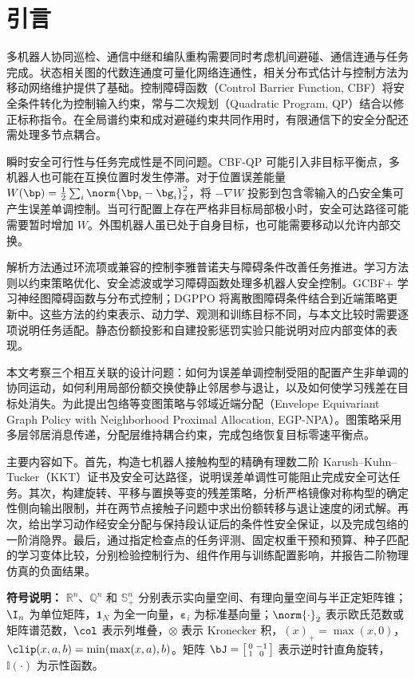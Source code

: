 \section{引言}\label{sec:intro}
多机器人协同巡检、通信中继和编队重构需要同时考虑机间避碰、通信连通与任务完成。状态相关图的代数连通度可量化网络连通性，相关分布式估计与控制方法为移动网络维护提供了基础\cite{yang2010decentralized,sabattini2013decentralized,ong2021connectivity}。控制障碍函数（Control Barrier Function, CBF）将安全条件转化为控制输入约束，常与二次规划（Quadratic Program, QP）结合以修正标称指令\cite{ames2017cbf,breeden2022sampled}。在全局谱约束和成对避碰约束共同作用时，有限通信下的安全分配还需处理多节点耦合\cite{tan2025violationfree}。

瞬时安全可行性与任务完成性是不同问题。CBF-QP 可能引入非目标平衡点，多机器人也可能在互换位置时发生停滞\cite{reis2021,tan2024equilibria,grover2023deadlock}。对于位置误差能量 $W(\bp)=\frac12\sum_i\norm{\bp_i-\bg_i}_2^2$，将 $-\nabla W$ 投影到包含零输入的凸安全集可产生误差单调控制\cite{allibhoy2024safegradient}。当可行配置上存在严格非目标局部极小时，安全可达路径可能需要暂时增加 $W$。外围机器人虽已处于自身目标，也可能需要移动以允许内部交换。

解析方法通过环流项或兼容的控制李雅普诺夫与障碍条件改善任务推进\cite{goncalves2023circulation,dai2024compatible}。学习方法则以约束策略优化、安全滤波或学习障碍函数处理多机器人安全控制\cite{gu2023safe,wabersich2021}。GCBF+ 学习神经图障碍函数与分布式控制\cite{zhang2025gcbf}；DGPPO 将离散图障碍条件结合到近端策略更新中\cite{zhang2025dgppo}。这些方法的约束表示、动力学、观测和训练目标不同，与本文比较时需要逐项说明任务适配。静态份额投影和自建投影惩罚实验只能说明对应内部变体的表现。

本文考察三个相互关联的设计问题：如何为误差单调控制受阻的配置产生非单调的协同运动，如何利用局部份额交换使静止邻居参与退让，以及如何使学习残差在目标处消失。为此提出包络等变图策略与邻域近端分配（Envelope Equivariant Graph Policy with Neighborhood Proximal Allocation, EGP-NPA）。图策略采用多层邻居消息传递，分配层维持耦合约束，完成包络恢复目标零速平衡点。

主要内容如下。首先，构造七机器人接触构型的精确有理数二阶 Karush--Kuhn--Tucker（KKT）证书及安全可达路径，说明误差单调性可能阻止完成安全可达任务。其次，构建旋转、平移与置换等变的残差策略，分析严格镜像对称构型的确定性侧向输出限制，并在两节点接触子问题中求出份额转移与退让速度的闭式解。再次，给出学习动作经安全分配与保持段认证后的条件性安全保证，以及完成包络的一阶消隐界。最后，通过指定检查点的任务评测、固定权重干预和预算、种子匹配的学习变体比较，分别检验控制行为、组件作用与训练配置影响，并报告二阶物理仿真的负面结果。

\textbf{符号说明：} $\mathbb R^n$、$\mathbb Q^n$ 和 $\mathbb S_+^n$ 分别表示实向量空间、有理向量空间与半正定矩阵锥；$\I_n$ 为单位矩阵，$\boldsymbol1_N$ 为全一向量，$\boldsymbol\varepsilon_i$ 为标准基向量；$\norm{\cdot}_2$ 表示欧氏范数或矩阵谱范数，$\col$ 表示列堆叠，$\otimes$ 表示 Kronecker 积，$(x)_+=\max(x,0)$，$\clip(x,a,b)=\min(\max(x,a),b)$。矩阵 $\bJ=\left[\begin{smallmatrix}0&-1\\1&0\end{smallmatrix}\right]$ 表示逆时针直角旋转，$\mathbb I(\cdot)$ 为示性函数。
